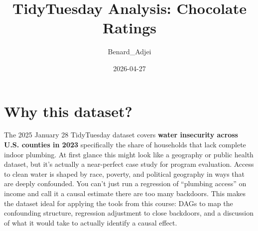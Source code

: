 \documentclass[
]{article}
\title{TidyTuesday Analysis: Chocolate Ratings}
\author{Benard\_Adjei}
\date{2026-04-27}
\newenvironment{Shaded}{\begin{snugshade}}{\end{snugshade}}
\newcommand{\CommentTok}[1]{\textcolor[rgb]{0.56,0.35,0.01}{\textit{#1}}}
\newcommand{\DecValTok}[1]{\textcolor[rgb]{0.00,0.00,0.81}{#1}}
\newcommand{\FunctionTok}[1]{\textcolor[rgb]{0.13,0.29,0.53}{\textbf{#1}}}
\newcommand{\NormalTok}[1]{#1}
\newcommand{\OtherTok}[1]{\textcolor[rgb]{0.56,0.35,0.01}{#1}}
\newcommand{\SpecialCharTok}[1]{\textcolor[rgb]{0.81,0.36,0.00}{\textbf{#1}}}
\newcommand{\StringTok}[1]{\textcolor[rgb]{0.31,0.60,0.02}{#1}}
\begin{document}
\maketitle

\section{Why this dataset?}\label{why-this-dataset}

The 2025 January 28 TidyTuesday dataset covers \textbf{water insecurity
across U.S. counties in 2023} specifically the share of households that
lack complete indoor plumbing. At first glance this might look like a
geography or public health dataset, but it's actually a near-perfect
case study for program evaluation. Access to clean water is shaped by
race, poverty, and political geography in ways that are deeply
confounded. You can't just run a regression of ``plumbing access'' on
income and call it a causal estimate there are too many backdoors. This
makes the dataset ideal for applying the tools from this course: DAGs to
map the confounding structure, regression adjustment to close backdoors,
and a discussion of what it would take to actually identify a causal
effect.

\begin{Shaded}
\end{Shaded}
\end{document}
